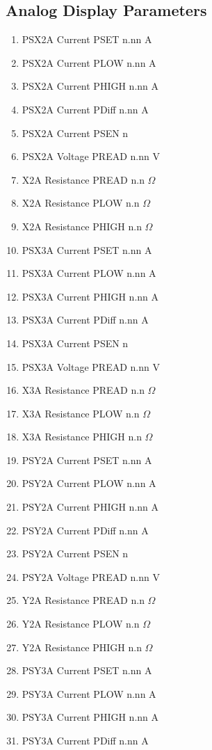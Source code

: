 \documentclass[11pt]{book}		%
\begin{document}
\subsection{Analog Display Parameters}

\begin{enumerate}
 \item PSX2A Current PSET  n.nn A
 \item PSX2A Current PLOW  n.nn A
 \item PSX2A Current PHIGH n.nn A
 \item PSX2A Current PDiff n.nn A
 \item PSX2A Current PSEN  n
 \item PSX2A Voltage PREAD n.nn V
 \item X2A Resistance PREAD n.n $\Omega$
 \item X2A Resistance PLOW n.n $\Omega$
 \item X2A Resistance PHIGH n.n $\Omega$
 \item PSX3A Current PSET  n.nn A
 \item PSX3A Current PLOW  n.nn A
 \item PSX3A Current PHIGH n.nn A
 \item PSX3A Current PDiff n.nn A
 \item PSX3A Current PSEN  n
 \item PSX3A Voltage PREAD n.nn V
 \item X3A Resistance PREAD n.n $\Omega$
 \item X3A Resistance PLOW n.n $\Omega$
 \item X3A Resistance PHIGH n.n $\Omega$
 \item PSY2A Current PSET  n.nn A
 \item PSY2A Current PLOW  n.nn A
 \item PSY2A Current PHIGH n.nn A
 \item PSY2A Current PDiff n.nn A
 \item PSY2A Current PSEN  n
 \item PSY2A Voltage PREAD n.nn V
 \item Y2A Resistance PREAD n.n $\Omega$
 \item Y2A Resistance PLOW n.n $\Omega$
 \item Y2A Resistance PHIGH n.n $\Omega$
 \item PSY3A Current PSET  n.nn A
 \item PSY3A Current PLOW  n.nn A
 \item PSY3A Current PHIGH n.nn A
 \item PSY3A Current PDiff n.nn A

\end{enumerate}
\end{document}
